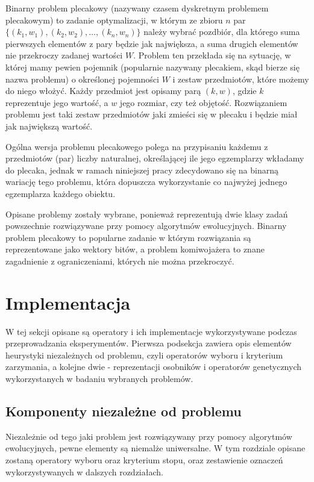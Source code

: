 \documentclass[twoside]{iisthesis}
\begin{document}
Binarny problem plecakowy (nazywany czasem dyskretnym problemem plecakowym) to zadanie optymalizacji, w którym ze zbioru $n$ par $\{ (k_1, w_1),  (k_2, w_2), \ldots, (k_n, w_n)\}$ należy wybrać pozdbiór, dla którego suma pierwszych elementów z pary będzie jak największa, a suma drugich elementów nie przekroczy zadanej wartości $W$.
Problem ten przekłada się na sytuację, w której mamy pewien pojemnik (popularnie nazywany plecakiem, skąd bierze się nazwa problemu) o określonej pojemności $W$ i zestaw przedmiotów, które możemy do niego włożyć. 
Każdy przedmiot jest opisamy parą $(k, w)$, gdzie $k$ reprezentuje jego wartość, a $w$ jego rozmiar, czy też objętość. 
Rozwiązaniem problemu jest taki zestaw przedmiotów jaki zmieści się w plecaku i będzie miał jak największą wartość. 

Ogólna wersja problemu plecakowego polega na przypisaniu każdemu z przedmiotów (par) liczby naturalnej, określającej ile jego egzemplarzy wkładamy do plecaka, jednak w ramach niniejszej pracy zdecydowano się na binarną wariację tego problemu, która dopuszcza wykorzystanie co najwyżej jednego egzemplarza każdego obiektu.

Opisane problemy zostały wybrane, ponieważ reprezentują dwie klasy zadań powszechnie rozwiązywane przy pomocy algorytmów ewolucyjnych. 
Binarny problem plecakowy to popularne zadanie w którym rozwiązania są reprezentowane jako wektory bitów, a problem komiwojażera to znane zagadnienie z ograniczeniami, których nie można przekroczyć. 

\section{Implementacja}

W tej sekcji opisane są operatory i ich implementacje wykorzystywane podczas przeprowadzania eksperymentów. 
Pierwsza podsekcja zawiera opis elementów heurystyki niezależnych od problemu, czyli operatorów wyboru i kryterium zarzymania, a kolejne dwie - reprezentacji osobników i operatorów genetycznych wykorzystanych w badaniu wybranych problemów.

\subsection{Komponenty niezależne od problemu}

Niezależnie od tego jaki problem jest rozwiązywany przy pomocy algorytmów ewolucyjnych, pewne elementy są niemalże uniwersalne. 
W tym rozdziale opisane zostaną operatory wyboru oraz kryterium stopu, oraz zestawienie oznaczeń wykorzystywanych w dalszych rozdziałach.
\end{document}
